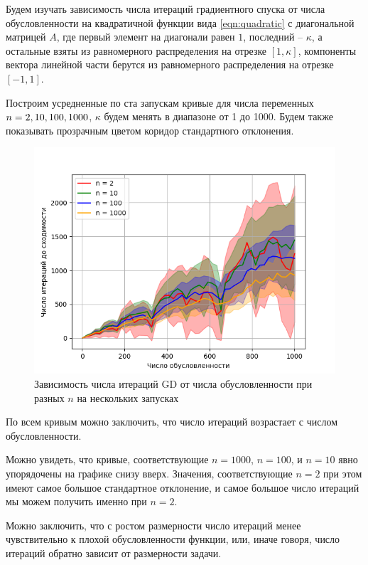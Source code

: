\documentclass[11pt]{article}
\begin{document}
Будем изучать зависимость числа итераций градиентного спуска от числа обусловленности на квадратичной функции вида \eqref{eqn:quadratic} с диагональной матрицей $A$, где первый элемент на диагонали равен $1$, последний -- $\kappa$, а остальные взяты из равномерного распределения на отрезке $[1, \kappa]$, компоненты вектора линейной части берутся из равномерного распределения на отрезке $[-1, 1]$.

Построим усредненные по ста запускам кривые для числа переменных $n = 2, 10, \\100, 1000$,
$\kappa$ будем менять в диапазоне от 1 до 1000. Будем также показывать прозрачным цветом коридор стандартного отклонения.


\begin{figure}[h!p]
	\centering
    \includegraphics[width=1.0\textwidth]{pics/iterations_vs_condition_number.png}
\captionsetup{justification=centering}
\caption{Зависимость числа итераций GD от числа обусловленности при разных $n$ на нескольких запусках}
\end{figure}

По всем кривым можно заключить, что число итераций возрастает с числом обусловленности.

Можно увидеть, что кривые, соответствующие $n=1000$, $n=100$, и $n=10$ явно упорядочены на графике снизу вверх. Значения, соответствующие $n = 2$ при этом имеют самое большое стандартное отклонение, и самое большое число итераций мы можем получить именно при $n=2$.

Можно заключить, что с ростом размерности число итераций менее чувствительно к плохой обусловленности функции, или, иначе говоря, число итераций обратно зависит от размерности задачи.
\end{document}
